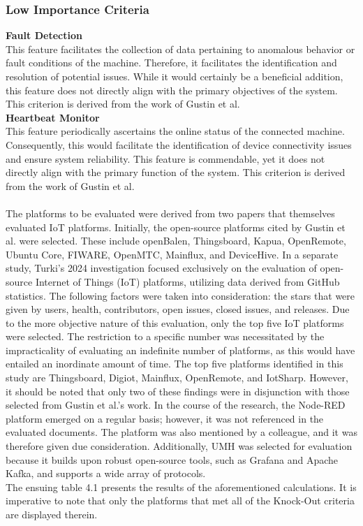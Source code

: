 \subsubsection{Low Importance Criteria}
\textbf{Fault Detection}\\
This feature facilitates the collection of data pertaining to anomalous behavior or fault conditions of the machine. Therefore, it facilitates the identification and resolution of potential issues. While it would certainly be a beneficial addition, this feature does not directly align with the primary objectives of the system.
This criterion is derived from the work of Gustin et al.\\
\textbf{Heartbeat Monitor}\\
This feature periodically ascertains the online status of the connected machine. Consequently, this would facilitate the identification of device connectivity issues and ensure system reliability.
This feature is commendable, yet it does not directly align with the primary function of the system.
This criterion is derived from the work of Gustin et al.\\\\


The  platforms to be evaluated were derived from two papers that themselves evaluated IoT platforms. Initially, the open-source platforms cited by Gustin et al. were selected. These include openBalen, Thingsboard, Kapua, OpenRemote, Ubuntu Core, FIWARE, OpenMTC, Mainflux, and DeviceHive. In a separate study, Turki's 2024 investigation focused exclusively on the evaluation of open-source Internet of Things (IoT) platforms, utilizing data derived from GitHub statistics. The following factors were taken into consideration: the stars that were given by users, health, contributors, open issues, closed issues, and releases. Due to the more objective nature of this evaluation, only the top five IoT platforms were selected. The restriction to a specific number was necessitated by the impracticality of evaluating an indefinite number of platforms, as this would have entailed an inordinate amount of time. The top five platforms identified in this study are Thingsboard, Digiot, Mainflux, OpenRemote, and IotSharp.  However, it should be noted that only two of these findings were in disjunction with those selected from Gustin et al.'s work. In the course of the research, the Node-RED platform emerged on a regular basis; however, it was not referenced in the evaluated documents. The platform was also mentioned by a colleague, and it was therefore given due consideration. Additionally, UMH was selected for evaluation because it builds upon robust open-source tools, such as Grafana and Apache Kafka, and supports a wide array of protocols.\\
The ensuing table 4.1 presents the results of the aforementioned calculations. It is imperative to note that only the platforms that met all of the Knock-Out criteria are displayed therein.\\

